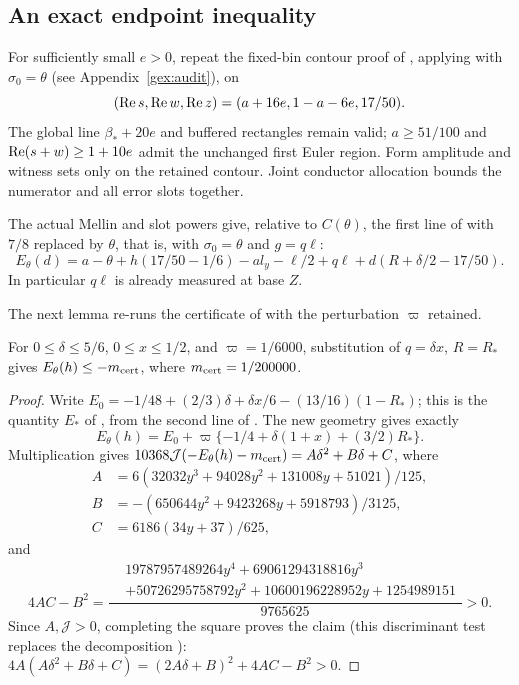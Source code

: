 \subsection{An exact endpoint inequality}

For sufficiently small \(e>0\), repeat the fixed-bin contour proof
of \cite[Lemma 20.1]{OAI26}, applying \cite[Lemmas 10.3 and 10.4]{OAI26}
with \(\sigma_0=\theta\) (see Appendix~\ref{gex:audit}), on
\[
 (\operatorname{Re} s,\operatorname{Re} w,\operatorname{Re} z)=(a+16e,1-a-6e,17/50).
\]
The global line \(\beta_*+20e\) and buffered rectangles remain
valid; \(a\ge51/100\) and \(\operatorname{Re}(s+w)\ge1+10e\) admit the
unchanged first Euler region. Form amplitude and witness sets
only on the retained contour. Joint conductor allocation bounds
the numerator and all error slots together.

The actual Mellin and slot powers give, relative to \(C(\theta)\),
the first line of \cite[(20.4)]{OAI26} with \(7/8\) replaced by
\(\theta\), that is, \cite[(10.15)]{OAI26} with \(\sigma_0=\theta\) and \(g=q\ell\):
\begin{equation}\label{gex:high-central-exponent}
 E_\theta(d)=a-\theta+h(17/50-1/6)-a l_y-\ell/2+q\ell
             +d(R+\delta/2-17/50).
\end{equation}
In particular \(q\ell\) is already measured at base \(Z\).

The next lemma re-runs the certificate of \cite[Lemma 20.2]{OAI26}
with the perturbation \(\varpi\) retained.

\begin{lemma}\label{gex:endpoint}
For \(0\le\delta\le5/6\), \(0\le x\le1/2\), and \(\varpi=1/6000\),
substitution of \(q=\delta x\), \(R=R_*\) gives
\(E_\theta(h)\le-m_{\rm cert}\), where \(m_{\rm cert}=1/200000\).
\end{lemma}
\begin{proof}
Write \(E_0=-1/48+(2/3)\delta+\delta x/6-(13/16)(1-R_*)\); this is
the quantity \(E_*\) of \cite[Lemma 20.2]{OAI26}, from the second line
of \cite[(20.4)]{OAI26}. The new geometry gives exactly
\[
 E_\theta(h)=E_0+\varpi\{-1/4+\delta(1+x)+(3/2)R_*\}.
\]
Multiplication gives
\(10368\mathcal J(-E_\theta(h)-m_{\rm cert})=A\delta^2+B\delta+C\), where
\begin{align*}
 A&=6(32032y^3+94028y^2+131008y+51021)/125,\\
 B&=-(650644y^2+9423268y+5918793)/3125,\\
 C&=6186(34y+37)/625,
\end{align*}
and
\[
 4AC-B^2=\frac{\begin{aligned}
 &19787957489264y^4+69061294318816y^3\\[-2pt]
 &+50726295758792y^2+10600196228952y+1254989151
 \end{aligned}}{9765625}>0 .
\]
Since \(A,\mathcal J>0\), completing the square proves the claim
(this discriminant test replaces the decomposition
\cite[(20.9)]{OAI26}):
\(4A(A\delta^2+B\delta+C)=(2A\delta+B)^2+4AC-B^2>0\).
\end{proof}

